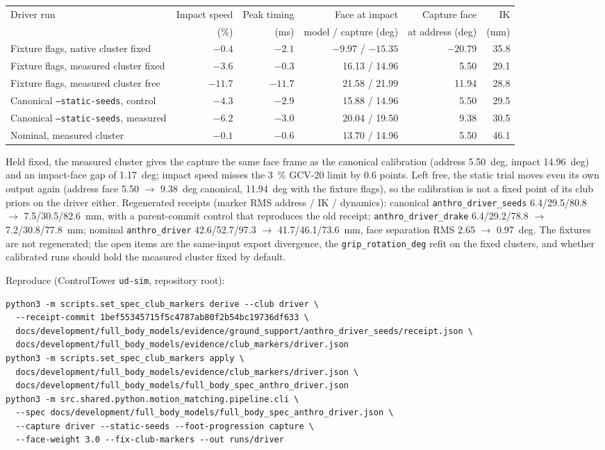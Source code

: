 \documentclass[11pt,a4paper]{article}
\begin{document}
\begin{center}
\begin{tabular}{lrrrrr}
\hline
Driver run & Impact speed & Peak timing & Face at impact & Capture face & IK \\
 & (\%) & (ms) & model / capture (deg) & at address (deg) & (mm) \\
\hline
Fixture flags, native cluster fixed & $-0.4$ & $-2.1$ & $-9.97$ / $-15.35$ & $-20.79$ & 35.8 \\
Fixture flags, measured cluster fixed & $-3.6$ & $-0.3$ & 16.13 / 14.96 & 5.50 & 29.1 \\
Fixture flags, measured cluster free & $-11.7$ & $-11.7$ & 21.58 / 21.99 & 11.94 & 28.8 \\
Canonical \texttt{--static-seeds}, control & $-4.3$ & $-2.9$ & 15.88 / 14.96 & 5.50 & 29.5 \\
Canonical \texttt{--static-seeds}, measured & $-6.2$ & $-3.0$ & 20.04 / 19.50 & 9.38 & 30.5 \\
Nominal, measured cluster & $-0.1$ & $-0.6$ & 13.70 / 14.96 & 5.50 & 46.1 \\
\hline
\end{tabular}
\end{center}
Held fixed, the measured cluster gives the capture the same face frame as
the canonical calibration (address 5.50~deg, impact 14.96~deg) and an
impact-face gap of 1.17~deg; impact speed misses the 3~\% GCV-20 limit by
0.6 points. Left free, the static trial moves even its own output again
(address face 5.50 $\to$ 9.38~deg canonical, 11.94~deg with the fixture
flags), so the calibration is not a fixed point of its club priors on the
driver either. Regenerated receipts (marker RMS address / IK / dynamics):
canonical \texttt{anthro\_driver\_seeds} 6.4/29.5/80.8 $\to$
7.5/30.5/82.6~mm, with a parent-commit control that reproduces the old
receipt; \texttt{anthro\_driver\_drake} 6.4/29.2/78.8 $\to$
7.2/30.8/77.8~mm; nominal \texttt{anthro\_driver} 42.6/52.7/97.3 $\to$
41.7/46.1/73.6~mm, face separation RMS 2.65 $\to$ 0.97~deg. The fixtures
are not regenerated; the open items are the same-input export divergence,
the \texttt{grip\_rotation\_deg} refit on the fixed clusters, and whether
calibrated runs should hold the measured cluster fixed by default.

Reproduce (ControlTower \texttt{ud-sim}, repository root):
\begin{verbatim}
python3 -m scripts.set_spec_club_markers derive --club driver \
  --receipt-commit 1bef55345715f5c4787ab80f2b54bc19736df633 \
  docs/development/full_body_models/evidence/ground_support/anthro_driver_seeds/receipt.json \
  docs/development/full_body_models/evidence/club_markers/driver.json
python3 -m scripts.set_spec_club_markers apply \
  docs/development/full_body_models/evidence/club_markers/driver.json \
  docs/development/full_body_models/full_body_spec_anthro_driver.json
python3 -m src.shared.python.motion_matching.pipeline.cli \
  --spec docs/development/full_body_models/full_body_spec_anthro_driver.json \
  --capture driver --static-seeds --foot-progression capture \
  --face-weight 3.0 --fix-club-markers --out runs/driver
\end{verbatim}
\end{document}

